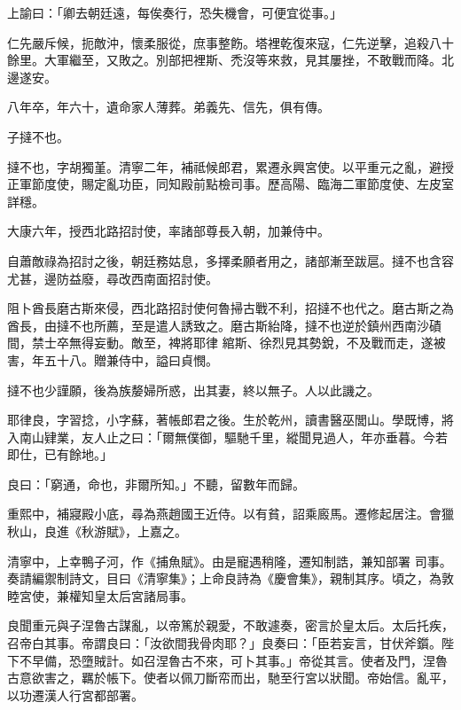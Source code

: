 \begin{pinyinscope}
 上諭曰：「卿去朝廷遠，每俟奏行，恐失機會，可便宜從事。」



 仁先嚴斥候，扼敵沖，懷柔服從，庶事整飭。塔裡乾復來寇，仁先逆擊，追殺八十餘里。大軍繼至，又敗之。別部把裡斯、禿沒等來救，見其屢挫，不敢戰而降。北邊遂安。



 八年卒，年六十，遺命家人薄葬。弟義先、信先，俱有傳。



 子撻不也。



 撻不也，字胡獨堇。清寧二年，補祗候郎君，累遷永興宮使。以平重元之亂，避授正軍節度使，賜定亂功臣，同知殿前點檢司事。歷高陽、臨海二軍節度使、左皮室詳穩。



 大康六年，授西北路招討使，率諸部尊長入朝，加兼侍中。



 自蕭敵祿為招討之後，朝廷務姑息，多擇柔願者用之，諸部漸至跋扈。撻不也含容尤甚，邊防益廢，尋改西南面招討使。



 阻卜酋長磨古斯來侵，西北路招討使何魯掃古戰不利，招撻不也代之。磨古斯之為酋長，由撻不也所薦，至是遣人誘致之。磨古斯紿降，撻不也逆於鎮州西南沙磧間，禁士卒無得妄動。敵至，裨將耶律
 綰斯、徐烈見其勢銳，不及戰而走，遂被害，年五十八。贈兼侍中，謚曰貞憫。



 撻不也少謹願，後為族嫠婦所惑，出其妻，終以無子。人以此譏之。



 耶律良，字習捻，小字蘇，著帳郎君之後。生於乾州，讀書醫巫閭山。學既博，將入南山肄業，友人止之曰：「爾無僕御，驅馳千里，縱聞見過人，年亦垂暮。今若即仕，已有餘地。」



 良曰：「窮通，命也，非爾所知。」不聽，留數年而歸。



 重熙中，補寢殿小底，尋為燕趙國王近侍。以有貧，詔乘廄馬。遷修起居注。會獵秋山，良進《秋游賦》，上嘉之。



 清寧中，上幸鴨子河，作《捕魚賦》。由是寵遇稍隆，遷知制誥，兼知部署
 司事。奏請編禦制詩文，目曰《清寧集》；上命良詩為《慶會集》，親制其序。頃之，為敦睦宮使，兼權知皇太后宮諸局事。



 良聞重元與子涅魯古謀亂，以帝篤於親愛，不敢遽奏，密言於皇太后。太后托疾，召帝白其事。帝謂良曰：「汝欲間我骨肉耶？」良奏曰：「臣若妄言，甘伏斧鑕。陛下不早備，恐墮賊計。如召涅魯古不來，可卜其事。」帝從其言。使者及門，涅魯古意欲害之，羈於帳下。使者以佩刀斷帟而出，馳至行宮以狀聞。帝始信。亂平，以功遷漢人行宮都部署。




\end{pinyinscope}
